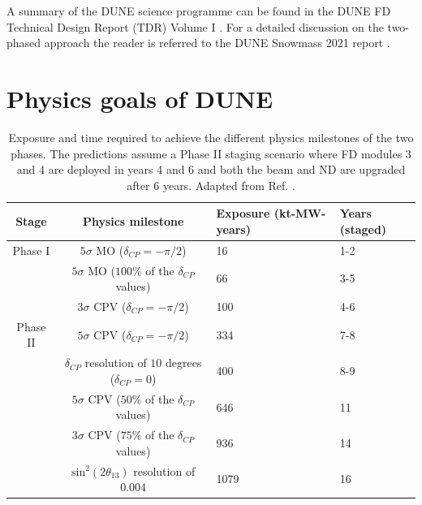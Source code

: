 A summary of the DUNE science programme can be found in the DUNE FD Technical Design Report (TDR) Volume I \cite{DUNE2020TDR1}. For a detailed discussion on the two-phased approach the reader is referred to the DUNE Snowmass 2021 report \cite{DUNE2022Snowmass}.

\section{Physics goals of DUNE}

\begin{table}[]
	\caption[Exposure and time required to achieve the different physics milestones of the two phases.]{Exposure and time required to achieve the different physics milestones of the two phases. The predictions assume a Phase II staging scenario where FD modules 3 and 4 are deployed in years 4 and 6 and both the beam and ND are upgraded after 6 years. Adapted from Ref. \cite{DUNE2022Snowmass}.}
	\centering
	\begin{tabular}{c|c|C{3.0cm}|C{2.0cm}}
	Stage    & Physics milestone                                          & Exposure (kt-MW-years) & Years (staged) \\[3mm] \hline
	\rule{0pt}{1.1\normalbaselineskip}Phase I  & $5\sigma$ MO ($\delta_{CP} = -\pi/2$)                      & 16                     & 1-2            \\[1mm]
			 & $5\sigma$ MO ($100\%$ of the $\delta_{CP}$ values)         & 66                     & 3-5            \\[1mm]
			 & $3\sigma$ CPV ($\delta_{CP} = -\pi/2$)                     & 100                    & 4-6            \\[1mm] \hline
			 \rule{0pt}{1.1\normalbaselineskip}Phase II & $5\sigma$ CPV ($\delta_{CP} = -\pi/2$)                     & 334                    & 7-8            \\[1mm]
			 & $\delta_{CP}$ resolution of $10$ degrees ($\delta_{CP}=0$) & 400                    & 8-9            \\[1mm]
			 & $5\sigma$ CPV ($50\%$ of the $\delta_{CP}$ values)         & 646                    & 11             \\[1mm]
			 & $3\sigma$ CPV ($75\%$ of the $\delta_{CP}$ values)         & 936                    & 14             \\[1mm]
			 & $\mathrm{sin}^{2}(2\theta_{13})$ resolution of $0.004$       & 1079                   & 16            
	\end{tabular}
	\label{tab:dune_phases_physics}
\end{table}

